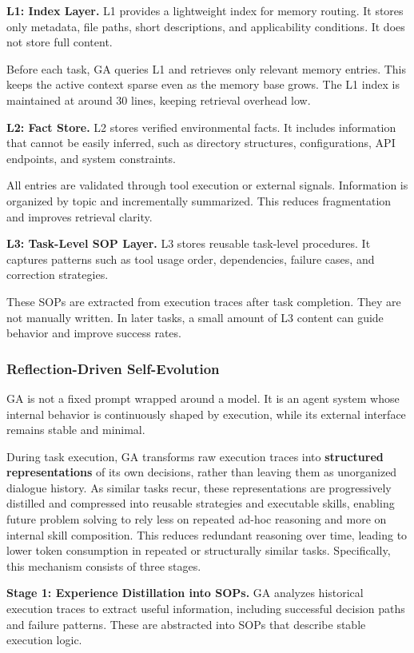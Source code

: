 \textbf{L1: Index Layer.} L1 provides a lightweight index for memory routing. It stores only metadata, file paths, short descriptions, and applicability conditions. It does not store full content.

Before each task, GA queries L1 and retrieves only relevant memory entries. This keeps the active context sparse even as the memory base grows. The L1 index is maintained at around 30 lines, keeping retrieval overhead low.

\textbf{L2: Fact Store.}  L2 stores verified environmental facts. It includes information that cannot be easily inferred, such as directory structures, configurations, API endpoints, and system constraints.

All entries are validated through tool execution or external signals. Information is organized by topic and incrementally summarized. This reduces fragmentation and improves retrieval clarity.

\textbf{L3: Task-Level SOP Layer.} L3 stores reusable task-level procedures. It captures patterns such as tool usage order, dependencies, failure cases, and correction strategies.

These SOPs are extracted from execution traces after task completion. They are not manually written. In later tasks, a small amount of L3 content can guide behavior and improve success rates.

\subsubsection{Reflection-Driven Self-Evolution}
\label{sec:self-evolution}
GA is not a fixed prompt wrapped around a model. It is an agent system whose internal behavior is continuously shaped by execution, while its external interface remains stable and minimal.

During task execution, GA transforms raw execution traces into \textbf{structured representations} of its own decisions, rather than leaving them as unorganized dialogue history. As similar tasks recur, these representations are progressively distilled and compressed into reusable strategies and executable skills, enabling future problem solving to rely less on repeated ad-hoc reasoning and more on internal skill composition. This reduces redundant reasoning over time, leading to lower token consumption in repeated or structurally similar tasks. Specifically, this mechanism consists of three stages.

\textbf{Stage 1: Experience Distillation into SOPs.} GA analyzes historical execution traces to extract useful information, including successful decision paths and failure patterns. These are abstracted into SOPs that describe stable execution logic.

